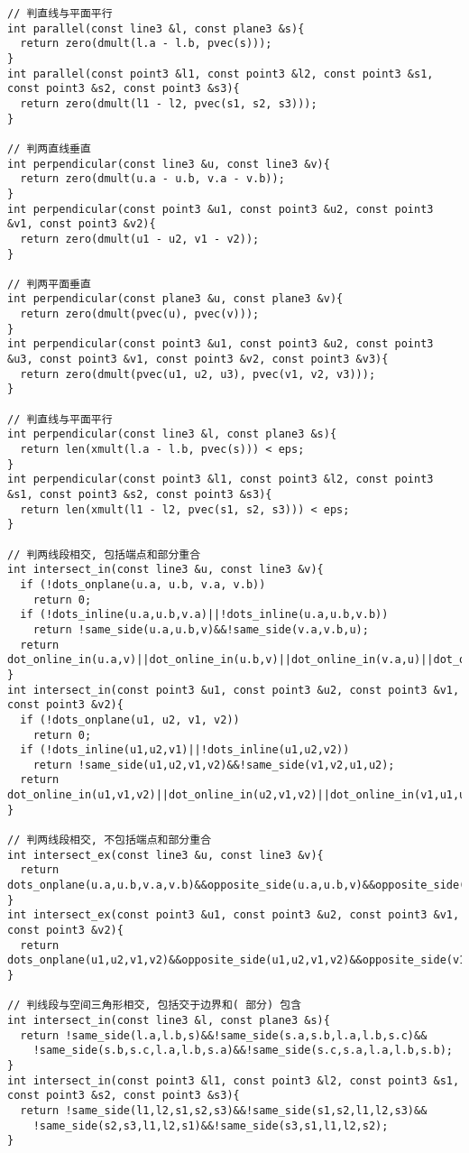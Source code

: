 \begin{lstlisting}[language={}]
// 判直线与平面平行
int parallel(const line3 &l, const plane3 &s){
  return zero(dmult(l.a - l.b, pvec(s)));
}
int parallel(const point3 &l1, const point3 &l2, const point3 &s1, const point3 &s2, const point3 &s3){
  return zero(dmult(l1 - l2, pvec(s1, s2, s3)));
}

// 判两直线垂直
int perpendicular(const line3 &u, const line3 &v){
  return zero(dmult(u.a - u.b, v.a - v.b));
}
int perpendicular(const point3 &u1, const point3 &u2, const point3 &v1, const point3 &v2){
  return zero(dmult(u1 - u2, v1 - v2));
}

// 判两平面垂直
int perpendicular(const plane3 &u, const plane3 &v){
  return zero(dmult(pvec(u), pvec(v)));
}
int perpendicular(const point3 &u1, const point3 &u2, const point3 &u3, const point3 &v1, const point3 &v2, const point3 &v3){
  return zero(dmult(pvec(u1, u2, u3), pvec(v1, v2, v3)));
}

// 判直线与平面平行
int perpendicular(const line3 &l, const plane3 &s){
  return len(xmult(l.a - l.b, pvec(s))) < eps;
}
int perpendicular(const point3 &l1, const point3 &l2, const point3 &s1, const point3 &s2, const point3 &s3){
  return len(xmult(l1 - l2, pvec(s1, s2, s3))) < eps;
}

// 判两线段相交, 包括端点和部分重合
int intersect_in(const line3 &u, const line3 &v){
  if (!dots_onplane(u.a, u.b, v.a, v.b))
    return 0;
  if (!dots_inline(u.a,u.b,v.a)||!dots_inline(u.a,u.b,v.b))
    return !same_side(u.a,u.b,v)&&!same_side(v.a,v.b,u);
  return dot_online_in(u.a,v)||dot_online_in(u.b,v)||dot_online_in(v.a,u)||dot_online_in(v.b,u);
}
int intersect_in(const point3 &u1, const point3 &u2, const point3 &v1, const point3 &v2){
  if (!dots_onplane(u1, u2, v1, v2))
    return 0;
  if (!dots_inline(u1,u2,v1)||!dots_inline(u1,u2,v2))
    return !same_side(u1,u2,v1,v2)&&!same_side(v1,v2,u1,u2);
  return dot_online_in(u1,v1,v2)||dot_online_in(u2,v1,v2)||dot_online_in(v1,u1,u2)||dot_online_in(v2,u1,u2);
}

// 判两线段相交, 不包括端点和部分重合
int intersect_ex(const line3 &u, const line3 &v){
  return dots_onplane(u.a,u.b,v.a,v.b)&&opposite_side(u.a,u.b,v)&&opposite_side(v.a,v.b,u);
}
int intersect_ex(const point3 &u1, const point3 &u2, const point3 &v1, const point3 &v2){
  return dots_onplane(u1,u2,v1,v2)&&opposite_side(u1,u2,v1,v2)&&opposite_side(v1,v2,u1,u2);
}

// 判线段与空间三角形相交, 包括交于边界和( 部分) 包含
int intersect_in(const line3 &l, const plane3 &s){
  return !same_side(l.a,l.b,s)&&!same_side(s.a,s.b,l.a,l.b,s.c)&&
    !same_side(s.b,s.c,l.a,l.b,s.a)&&!same_side(s.c,s.a,l.a,l.b,s.b);
}
int intersect_in(const point3 &l1, const point3 &l2, const point3 &s1, const point3 &s2, const point3 &s3){
  return !same_side(l1,l2,s1,s2,s3)&&!same_side(s1,s2,l1,l2,s3)&&
    !same_side(s2,s3,l1,l2,s1)&&!same_side(s3,s1,l1,l2,s2);
}


\end{lstlisting}
